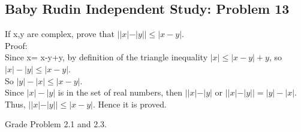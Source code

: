 \newpage 
\subsection*{Baby Rudin Independent Study: Problem 13}
If x,y are complex, prove that $||x|-|y|| \leq|x-y|.$ \\
Proof: \\ 
Since x= x-y+y, by definition of the triangle inequality $|x| \leq |x-y|+y$, so $|x|-|y| \leq |x-y|.$ \\ 
So $|y|-|x| \leq |x-y|$. \\ 
Since $|x| - |y|$ is in the set of real numbers, then $||x|-|y|$ or $||x|-|y||= |y|-|x|.$ \\
Thus, $||x|-|y|| \leq |x-y|$. Hence it is proved. 
\begin{figure}[ht]\end{figure} 
\newpage
Grade Problem 2.1 and 2.3.  
